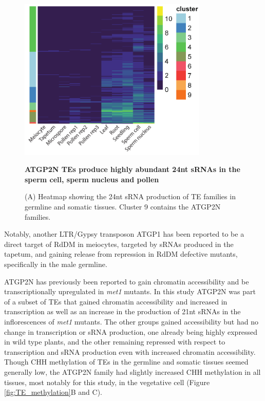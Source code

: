 \begin{figure}[htbp!] 
\centering    
    \includegraphics[width=0.8\textwidth]{Chapter2/Figs/Figure13_TE_families_heatmap.pdf}
\caption{\textbf{ATGP2N TEs produce highly abundant 24nt sRNAs in the sperm cell, sperm nucleus and pollen}}
\label{fig:TE_families}
\captionsetup{font=small}
    \caption*{(A) Heatmap showing the 24nt sRNA production of TE families in germline and somatic tissues. Cluster 9 contains the ATGP2N families.}
\end{figure}

Notably, another LTR/Gypsy transposon ATGP1 has been reported to be a direct target of RdDM in meiocytes, targeted by sRNAs produced in the tapetum, and gaining release from repression in RdDM defective mutants\citep{RN187}, specifically in the male germline.

ATGP2N has previously been reported to gain chromatin accessibility and be transcriptionally upregulated in \textit{met1} mutants. In this study ATGP2N was part of a subset of TEs that gained chromatin accessibility and increased in transcription as well as an increase in the production of 21nt sRNAs in the inflorescences of \textit{met1} mutants. The other groups gained accessibility but had no change in transcription or sRNA production, one already being highly expressed in wild type plants, and the other remaining repressed with respect to transcription and sRNA production even with increased chromatin accessibility\citep{RN184}. Though CHH methylation of TEs in the germline and somatic tissues seemed generally low, the ATGP2N family had slightly increased CHH methylation in all tissues, most notably for this study, in the vegetative cell (Figure \ref{fig:TE_methylation}B and C).

